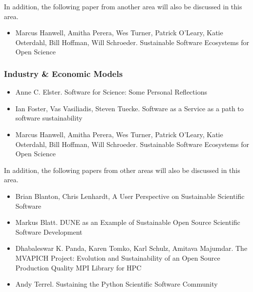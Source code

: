 \documentclass[11pt, oneside]{amsart}
\begin{document}
In addition, the following paper from another area will also be discussed in this area.

\begin{itemize}

\item Marcus Hanwell, Amitha Perera, Wes Turner, Patrick O'Leary, Katie Osterdahl, Bill Hoffman, Will Schroeder. Sustainable Software Ecosystems for Open Science \cite{Hanwell_WSSSPE}

\end{itemize}

\subsubsection{Industry \& Economic Models}

\begin{itemize}

\item Anne C. Elster. Software for Science: Some Personal Reflections \cite{Elster_WSSSPE}

\item Ian Foster, Vas Vasiliadis, Steven Tuecke. Software as a Service as a path to software sustainability \cite{Foster_WSSSPE}

\item Marcus Hanwell, Amitha Perera, Wes Turner, Patrick O'Leary, Katie Osterdahl, Bill Hoffman, Will Schroeder. Sustainable Software Ecosystems for Open Science \cite{Hanwell_WSSSPE}

\end{itemize}

In addition, the following papers from other areas will also be discussed in this area.

\begin{itemize}

\item Brian Blanton, Chris Lenhardt, A User Perspective on Sustainable Scientific Software \cite{Blanton_WSSSPE}

\item Markus Blatt. DUNE as an Example of Sustainable Open Source Scientific Software Development \cite{Blatt_WSSSPE}

\item Dhabaleswar K. Panda, Karen Tomko, Karl Schulz, Amitava Majumdar. The MVAPICH Project: Evolution and Sustainability of an Open Source Production Quality MPI Library for HPC \cite{Panda_WSSSPE}

\item Andy Terrel. Sustaining the Python Scientific Software Community \cite{Terrel_WSSSPE}

\end{itemize}
\end{document}
